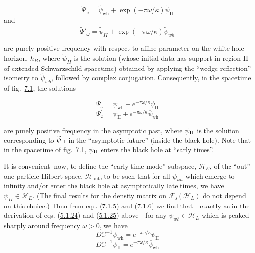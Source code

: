 \documentclass[11pt,a4paper]{article}
\begin{document}
\begin{equation*}
\widetilde{\Psi}_{\omega} = \widetilde{\psi}_{\text{wh}} + \exp(-\pi\omega/\kappa) \overline{\widetilde{\psi}}_{\text{II}} \tag{7.1.3}\label{eq:7.1.3}
\end{equation*}
and
\begin{equation*}
\widetilde{\Psi}'_{\omega} = \widetilde{\psi}_{II} + \exp(-\pi\omega/\kappa) \overline{\widetilde{\psi}}_{wh} \tag{7.1.4}\label{eq:7.1.4}
\end{equation*}

are purely positive frequency with respect to affine parameter on the white hole horizon, \(h_B\), where \(\widetilde{\psi}_{II}\) is the solution (whose initial data has support in region II of extended Schwarzschild spacetime) obtained by applying the ``wedge reflection'' isometry to \(\widetilde{\psi}_{wh}\), followed by complex conjugation. Consequently, in the spacetime of fig.~\hyperref[fig:7.1]{7.1}, the solutions

\hypertarget{source-170}{}
\begin{equation*}
\Psi_\omega=\psi_{\mathrm{wh}}+e^{-\pi\omega/\kappa}\overline{\psi}_{\mathrm{II}}\tag{7.1.5}\label{eq:7.1.5}
\end{equation*}
\begin{equation*}
\Psi^{\prime}_\omega=\psi_{\mathrm{II}}+e^{-\pi\omega/\kappa}\overline{\psi}_{\mathrm{wh}}\tag{7.1.6}\label{eq:7.1.6}
\end{equation*}

are purely positive frequency in the asymptotic past, where \(\psi_{\rm II}\) is the solution corresponding to \(\widetilde{\psi}_{\rm II}\) in the ``asymptotic future'' (inside the black hole). Note that in the spacetime of fig.~\hyperref[fig:7.1]{7.1}, \(\psi_{\rm II}\) enters the black hole at ``early times''.

It is convenient, now, to define the ``early time mode'' subspace, \(\mathcal{H}_E\), of the ``out'' one-particle Hilbert space, \(\mathcal{H}_{\mathrm{out}}\), to be such that for all \(\psi_{wh}\) which emerge to infinity and/or enter the black hole at asymptotically late times, we have \(\psi_{II} \in \mathcal{H}_E\). (The final results for the density matrix on \(\mathcal{F}_s(\mathcal{H}_L)\) do not depend on this choice.) Then from eqs. (\hyperref[eq:7.1.5]{7.1.5}) and (\hyperref[eq:7.1.6]{7.1.6}) we find that---exactly as in the derivation of eqs. (\hyperref[eq:5.1.24]{5.1.24}) and (\hyperref[eq:5.1.25]{5.1.25}) above---for any \(\psi_{wh} \in \mathcal{H}_L\) which is peaked sharply around frequency \(\omega > 0\), we have
\begin{equation*}
DC^{-1}\psi_{\mathrm{wh}}=e^{-\pi\omega/\kappa}\overline{\psi}_{\mathrm{II}}\tag{7.1.7}\label{eq:7.1.7}
\end{equation*}
\begin{equation*}
DC^{-1}\psi_{\mathrm{II}}=e^{-\pi\omega/\kappa}\overline{\psi}_{\mathrm{wh}}\tag{7.1.8}\label{eq:7.1.8}
\end{equation*}
\end{document}
